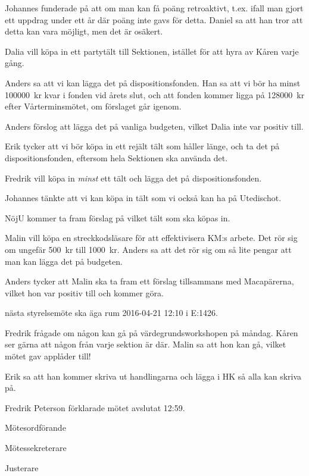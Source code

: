 \documentclass[10pt]{article}
\def\mo{Fredrik Peterson}
\def\ms{Erik Månsson}
\def\ji{Malin Lindström}
\begin{document}
\begin{paragrafer}
Johannes funderade på att om man kan få poäng retroaktivt, t.ex. ifall man gjort ett uppdrag under ett år där poäng inte gavs för detta. Daniel sa att han tror att detta kan vara möjligt, men det är osäkert.

Dalia vill köpa in ett partytält till Sektionen, istället för att hyra av Kåren varje gång.

Anders sa att vi kan lägga det på dispositionsfonden. Han sa att vi bör ha minst \SI{100000}{kr} kvar i fonden vid årets slut, och att fonden kommer ligga på \SI{128000}{kr} efter Vårterminsmötet, om förslaget går igenom.

Anders förslog att lägga det på vanliga budgeten, vilket Dalia inte var positiv till.

Erik tycker att vi bör köpa in ett rejält tält som håller länge, och ta det på dispositionsfonden, eftersom hela Sektionen ska använda det.

Fredrik vill köpa in \emph{minst} ett tält och lägga det på dispositionsfonden.

Johannes tänkte att vi kan köpa in tält som vi också kan ha på Utedischot.

NöjU kommer ta fram förslag på vilket tält som ska köpas in.

Malin vill köpa en streckkodsläsare för att effektivisera KM:s arbete. Det rör sig om ungefär \SI{500}{kr} till \SI{1000}{kr}. Anders sa att det rör sig om så lite pengar att man kan lägga det på budgeten.

Anders tycker att Malin ska ta fram ett förslag tillsammans med Macapärerna, vilket hon var positiv till och kommer göra.

\Mba nästa styrelsemöte ska äga rum 2016-04-21 12:10 i E:1426.

\Ibfu

Fredrik frågade om någon kan gå på värdegrundsworkshopen på måndag. Kåren ser gärna att någon från varje sektion är där. Malin sa att hon kan gå, vilket mötet gav applåder till!

Erik sa att han kommer skriva ut handlingarna och lägga i HK så alla kan skriva på.

{\mo} förklarade mötet avslutat 12:59.

\end{paragrafer}

\hidesignfoot
\begin{signatures}{3}
\signature{\mo}{Mötesordförande}
\signature{\ms}{Mötessekreterare}
\signature{\ji}{Justerare}
\end{signatures}
\end{document}

